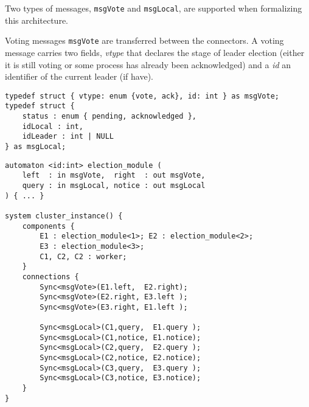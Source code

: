 Two types of messages, \texttt{msgVote} and \texttt{msgLocal}, are supported when formalizing this architecture.
\begin{example}
Voting messages \texttt{msgVote} are transferred between the connectors. A voting message carries two fields, \emph{vtype} that declares the stage of leader election (either it is still voting or some process has already been acknowledged) and a \emph{id} an identifier of the current leader (if have).
\begin{lstlisting} 
typedef struct { vtype: enum {vote, ack}, id: int } as msgVote;
typedef struct {
	status : enum { pending, acknowledged },
	idLocal : int,
	idLeader : int | NULL
} as msgLocal;
\end{lstlisting}
\end{example}


\begin{lstlisting}
automaton <id:int> election_module (
	left  : in msgVote,  right  : out msgVote,
	query : in msgLocal, notice : out msgLocal
) { ... }

system cluster_instance() {
	components {
		E1 : election_module<1>; E2 : election_module<2>;
		E3 : election_module<3>;
		C1, C2, C2 : worker;
	}	
	connections {
		Sync<msgVote>(E1.left,  E2.right);
		Sync<msgVote>(E2.right, E3.left );
		Sync<msgVote>(E3.right, E1.left );
		
		Sync<msgLocal>(C1,query,  E1.query );
		Sync<msgLocal>(C1,notice, E1.notice);
		Sync<msgLocal>(C2,query,  E2.query );
		Sync<msgLocal>(C2,notice, E2.notice);
		Sync<msgLocal>(C3,query,  E3.query );
		Sync<msgLocal>(C3,notice, E3.notice);
	}
}
\end{lstlisting}